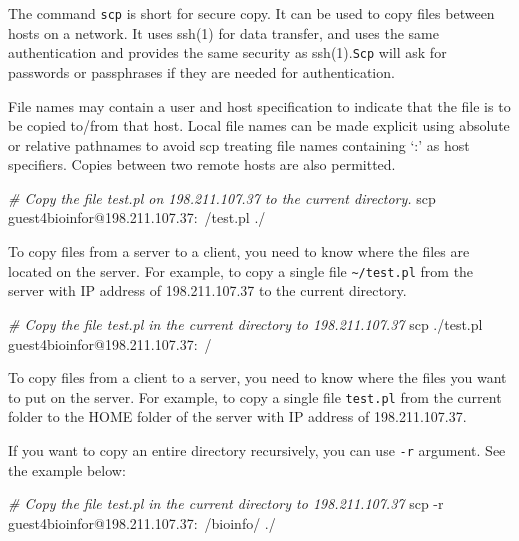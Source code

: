 \documentclass[]{book}
\makeatletter
\newenvironment{Shaded}{\begin{snugshade}}{\end{snugshade}}
\newcommand{\CommentTok}[1]{\textcolor[rgb]{0.56,0.35,0.01}{\textit{#1}}}
\newcommand{\FunctionTok}[1]{\textcolor[rgb]{0.00,0.00,0.00}{#1}}
\newcommand{\NormalTok}[1]{#1}
\newenvironment{kframe}{%
\medskip{}
\setlength{\fboxsep}{.8em}
 \def\at@end@of@kframe{}%
 \ifinner\ifhmode%
  \def\at@end@of@kframe{\end{minipage}}%
  \begin{minipage}{\columnwidth}%
 \fi\fi%
 \def\FrameCommand##1{\hskip\@totalleftmargin \hskip-\fboxsep
 \colorbox{shadecolor}{##1}\hskip-\fboxsep
     \hskip-\linewidth \hskip-\@totalleftmargin \hskip\columnwidth}%
 \MakeFramed {\advance\hsize-\width
   \@totalleftmargin\z@ \linewidth\hsize
   \@setminipage}}%
 {\par\unskip\endMakeFramed%
 \at@end@of@kframe}
\renewenvironment{Shaded}{\begin{kframe}}{\end{kframe}}
\theoremstyle{definition}
\theoremstyle{definition}
\theoremstyle{definition}
\theoremstyle{remark}
\makeatother
\begin{document}
The command \texttt{scp} is short for secure copy. It can be used to
copy files between hosts on a network. It uses ssh(1) for data transfer,
and uses the same authentication and provides the same security as
ssh(1).\texttt{Scp} will ask for passwords or passphrases if they are
needed for authentication.

File names may contain a user and host specification to indicate that
the file is to be copied to/from that host. Local file names can be made
explicit using absolute or relative pathnames to avoid scp treating file
names containing `:' as host specifiers. Copies between two remote hosts
are also permitted.

\begin{Shaded}
\begin{Highlighting}[]
\CommentTok{# Copy the file test.pl on 198.211.107.37 to the current directory.}
\FunctionTok{scp}\NormalTok{ guest4bioinfor@198.211.107.37:~/test.pl ./}
\end{Highlighting}
\end{Shaded}

To copy files from a server to a client, you need to know where the
files are located on the server. For example, to copy a single file
\texttt{\textasciitilde{}/test.pl} from the server with IP address of
198.211.107.37 to the current directory.

\begin{Shaded}
\begin{Highlighting}[]
\CommentTok{# Copy the file test.pl in the current directory to  198.211.107.37}
\FunctionTok{scp}\NormalTok{ ./test.pl guest4bioinfor@198.211.107.37:~/}
\end{Highlighting}
\end{Shaded}

To copy files from a client to a server, you need to know where the
files you want to put on the server. For example, to copy a single file
\texttt{test.pl} from the current folder to the HOME folder of the
server with IP address of 198.211.107.37.

If you want to copy an entire directory recursively, you can use
\texttt{-r} argument. See the example below:

\begin{Shaded}
\begin{Highlighting}[]
\CommentTok{# Copy the file test.pl in the current directory to  198.211.107.37}
\FunctionTok{scp}\NormalTok{ -r guest4bioinfor@198.211.107.37:~/bioinfo/ ./}
\end{Highlighting}
\end{Shaded}
\end{document}

